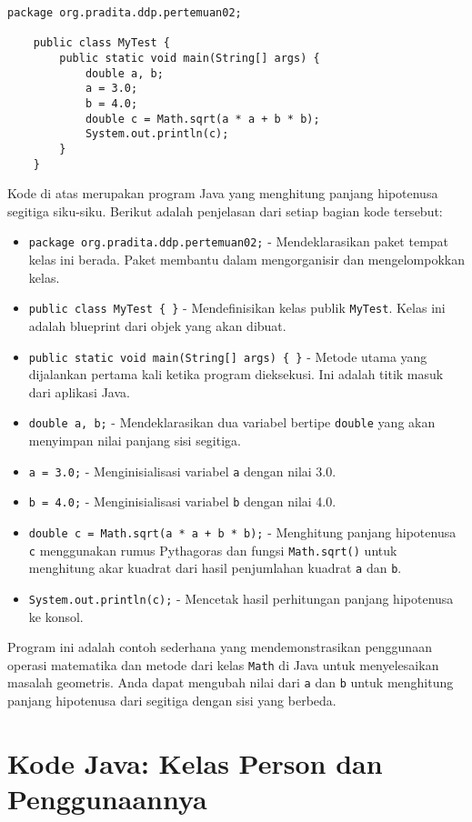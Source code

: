 \begin{lstlisting}[style=JavaStyle, caption={Kode Java: MyTest.java}]
	package org.pradita.ddp.pertemuan02;
	
	public class MyTest {
		public static void main(String[] args) {
			double a, b;
			a = 3.0;
			b = 4.0;
			double c = Math.sqrt(a * a + b * b);
			System.out.println(c);
		}
	}
\end{lstlisting}

Kode di atas merupakan program Java yang menghitung panjang hipotenusa segitiga siku-siku. Berikut adalah penjelasan dari setiap bagian kode tersebut:

\begin{itemize}
	\item \texttt{package org.pradita.ddp.pertemuan02;} - Mendeklarasikan paket tempat kelas ini berada. Paket membantu dalam mengorganisir dan mengelompokkan kelas.
	\item \texttt{public class MyTest \{ \}} - Mendefinisikan kelas publik \texttt{MyTest}. Kelas ini adalah blueprint dari objek yang akan dibuat.
	\item \texttt{public static void main(String[] args) \{ \}} - Metode utama yang dijalankan pertama kali ketika program dieksekusi. Ini adalah titik masuk dari aplikasi Java.
	\item \texttt{double a, b;} - Mendeklarasikan dua variabel bertipe \texttt{double} yang akan menyimpan nilai panjang sisi segitiga.
	\item \texttt{a = 3.0;} - Menginisialisasi variabel \texttt{a} dengan nilai 3.0.
	\item \texttt{b = 4.0;} - Menginisialisasi variabel \texttt{b} dengan nilai 4.0.
	\item \texttt{double c = Math.sqrt(a * a + b * b);} - Menghitung panjang hipotenusa \texttt{c} menggunakan rumus Pythagoras dan fungsi \texttt{Math.sqrt()} untuk menghitung akar kuadrat dari hasil penjumlahan kuadrat \texttt{a} dan \texttt{b}.
	\item \texttt{System.out.println(c);} - Mencetak hasil perhitungan panjang hipotenusa ke konsol.
\end{itemize}

Program ini adalah contoh sederhana yang mendemonstrasikan penggunaan operasi matematika dan metode dari kelas \texttt{Math} di Java untuk menyelesaikan masalah geometris. Anda dapat mengubah nilai dari \texttt{a} dan \texttt{b} untuk menghitung panjang hipotenusa dari segitiga dengan sisi yang berbeda.

\section{Kode Java: Kelas Person dan Penggunaannya}

